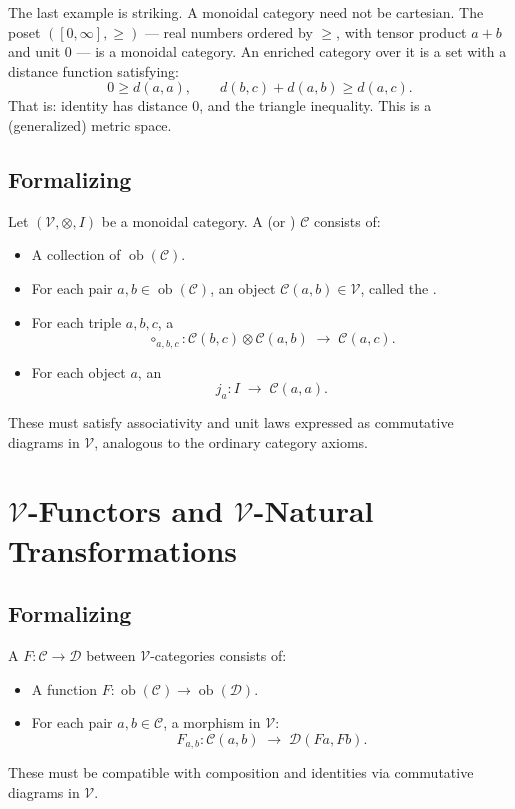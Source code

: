 The last example is striking. A monoidal category need not be cartesian. The
poset $([0,\infty], \geq)$ — real numbers ordered by $\geq$, with tensor product
$a + b$ and unit $0$ — is a monoidal category. An enriched category over it is
a set with a distance function satisfying:
\[
  0 \geq d(a, a), \qquad d(b,c) + d(a,b) \geq d(a,c).
\]
That is: identity has distance $0$, and the triangle inequality. This is a
(generalized) metric space.

\subsection{Formalizing}

\begin{definition}
Let $(\mathcal{V}, \otimes, I)$ be a monoidal category. A
 (or ) $\mathcal{C}$
consists of:
\begin{itemize}
  \item A collection of  $\operatorname{ob}(\mathcal{C})$.
  \item For each pair $a, b \in \operatorname{ob}(\mathcal{C})$, an object
    $\mathcal{C}(a,b) \in \mathcal{V}$, called the .
  \item For each triple $a, b, c$, a 
    \[
      \circ_{a,b,c} : \mathcal{C}(b,c) \otimes \mathcal{C}(a,b) \;\to\; \mathcal{C}(a,c).
    \]
  \item For each object $a$, an 
    \[
      j_a : I \;\to\; \mathcal{C}(a,a).
    \]
\end{itemize}
These must satisfy associativity and unit laws expressed as commutative diagrams
in $\mathcal{V}$, analogous to the ordinary category axioms.
\end{definition}

\section{$\mathcal{V}$-Functors and $\mathcal{V}$-Natural Transformations}

\subsection{Formalizing}

\begin{definition}
A  $F : \mathcal{C} \to \mathcal{D}$ between
$\mathcal{V}$-categories consists of:
\begin{itemize}
  \item A function $F : \operatorname{ob}(\mathcal{C}) \to \operatorname{ob}(\mathcal{D})$.
  \item For each pair $a, b \in \mathcal{C}$, a morphism in $\mathcal{V}$:
    \[
      F_{a,b} : \mathcal{C}(a, b) \;\to\; \mathcal{D}(Fa, Fb).
    \]
\end{itemize}
These must be compatible with composition and identities via commutative diagrams
in $\mathcal{V}$.
\end{definition}

